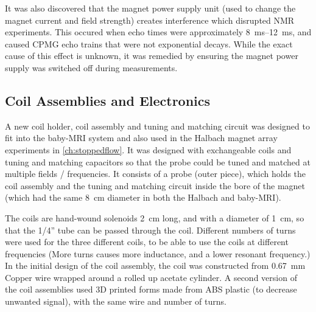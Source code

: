 It was also discovered that the magnet power supply unit (used to change the magnet current and field strength) creates interference which disrupted NMR experiments.
This occured when echo times were approximately \SIrange{8}{12}{ms}, and caused CPMG echo trains that were not exponential decays.
While the exact cause of this effect is unknown, it was remedied by ensuring the magnet power supply was switched off during measurements.

\subsection{Coil Assemblies and Electronics}
\label{sec:exptsetup-coil}
A new coil holder, coil assembly and tuning and matching circuit was designed to fit into the baby-MRI system and also used in the Halbach magnet array experiments in  \autoref{ch:stoppedflow}.
It was designed with exchangeable coils and tuning and matching capacitors so that the probe could be tuned and matched at multiple fields / frequencies.
It consists of a probe (outer piece), which holds the coil assembly and the tuning and matching circuit inside the bore of the magnet (which had the same \SI{8}{cm} diameter in both the Halbach and baby-MRI).

The coils are hand-wound solenoids \SI{2}{cm} long, and with a diameter of \SI{1}{cm}, so that the 1/4'' tube can be passed through the coil.
Different numbers of turns were used for the three different coils, to be able to use the coils at different frequencies (More turns causes more inductance, and a lower resonant frequency.)
In the initial design of the coil assembly, the coil was constructed from \SI{0.67}{mm} Copper wire wrapped around a rolled up acetate cylinder.
A second version of the coil assemblies used 3D printed forms made from ABS plastic (to decrease unwanted signal), with the same wire and number of turns.

